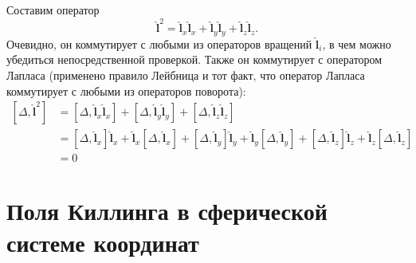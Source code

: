 \documentclass[12pt,a4paper]{article}
\newcommand{\V}[1]{\mathbf{#1}}
\newcommand{\Op}[1]{\hat{\V{#1}}}
\begin{document}
        Составим оператор
        \begin{equation}
            \Op{l}^2 = \Op{l}_x \Op{l}_x + \Op{l}_y \Op{l}_y + \Op{l}_z \Op{l}_z .
        \end{equation}
        Очевидно, он коммутирует с любыми из операторов вращений $\Op{l}_i$, в чем можно убедиться непосредственной проверкой. Также он коммутирует с оператором Лапласа (применено правило Лейбница и тот факт, что оператор Лапласа коммутирует с любыми из операторов поворота):
        \begin{equation}\begin{aligned}
            \left[ \Delta, \Op{l}^2 \right]
                &= \left[ \Delta, \Op{l}_x \Op{l}_x \right]
                    + \left[ \Delta, \Op{l}_y \Op{l}_y \right]
                    + \left[ \Delta, \Op{l}_z \Op{l}_z \right] \\
                &= \left[ \Delta, \Op{l}_x \right] \Op{l}_x
                    + \Op{l}_x \left[ \Delta, \Op{l}_x \right]
                    + \left[ \Delta, \Op{l}_y \right] \Op{l}_y
                    + \Op{l}_y \left[ \Delta, \Op{l}_y \right]
                    + \left[ \Delta, \Op{l}_z \right] \Op{l}_z
                    + \Op{l}_z \left[ \Delta, \Op{l}_z \right] \\
                &= 0
        \end{aligned}\end{equation}


    \section{Поля Киллинга в сферической системе координат}
\end{document}
